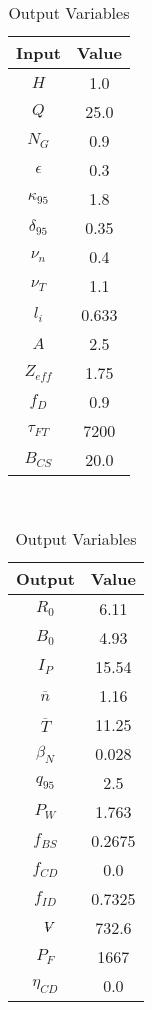\begin{table}[h!]
\centering  
\caption{Proteus Variables}
\hfill
\begin{subtable}[t]{0.4\textwidth}
\centering  
\caption{Input Variables} ~\\
\begin{tabular}{ c|c } 

Input            & Value           \\
\hline
$H$              & 1.0              \\
$Q$              & 25.0             \\
$N_{G}$          & 0.9              \\
$\epsilon$       & 0.3              \\
$\kappa_{95}$    & 1.8              \\
$\delta_{95}$    & 0.35             \\
$\nu_{n}$        & 0.4              \\
$\nu_{T}$        & 1.1              \\
$l_{i}$          & 0.633         \\
$A$              & 2.5              \\
$Z_{eff}$        & 1.75             \\
$f_{D}$          & 0.9              \\
$\tau_{FT}$      & 7200           \\
$B_{CS}$         & 20.0             \\

\end{tabular}
\end{subtable}
\hfill
\begin{subtable}[t]{0.5\textwidth}
\centering  
\caption{Output Variables} ~\\
\begin{tabular}{ c|c } 

Output           & Value       \\
\hline
$R_{0}$          & 6.11             \\
$B_{0}$          & 4.93            \\
$I_{P}$          & 15.54            \\
$\overline n$    & 1.16            \\
$\overline T$    & 11.25            \\
$\beta_{N}$       & 0.028            \\
$q_{95}$         & 2.5              \\
$P_{W}$          & 1.763            \\
$f_{BS}$         & 0.2675           \\
$f_{CD}$         & 0.0              \\
$f_{ID}$         & 0.7325           \\
$\volume$         & 732.6            \\
$P_{F}$          & 1667           \\
$\eta_{CD}$      & 0.0              \\


\end{tabular}
\end{subtable}
\end{table}
